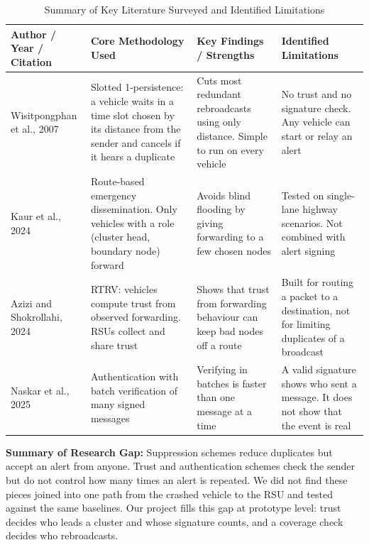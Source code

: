 \documentclass[11pt, a4paper]{article}
\begin{document}
\begin{table}[H]
    \centering
    \footnotesize
    \renewcommand{\arraystretch}{1.25}
    \begin{tabular}{|p{2.8cm}|p{4.2cm}|p{4.2cm}|p{3.2cm}|}
        \hline
        \textbf{Author / Year / Citation} & \textbf{Core Methodology Used} & \textbf{Key Findings / Strengths} & \textbf{Identified Limitations} \\
        \hline
        Wisitpongphan et al., 2007 \cite{wisitpongphan2007} & Slotted 1-persistence: a vehicle waits in a time slot chosen by its distance from the sender and cancels if it hears a duplicate & Cuts most redundant rebroadcasts using only distance. Simple to run on every vehicle & No trust and no signature check. Any vehicle can start or relay an alert \\
        \hline
        Kaur et al., 2024 \cite{kaur2024} & Route-based emergency dissemination. Only vehicles with a role (cluster head, boundary node) forward & Avoids blind flooding by giving forwarding to a few chosen nodes & Tested on single-lane highway scenarios. Not combined with alert signing \\
        \hline
        Azizi and Shokrollahi, 2024 \cite{azizi2024} & RTRV: vehicles compute trust from observed forwarding. RSUs collect and share trust & Shows that trust from forwarding behaviour can keep bad nodes off a route & Built for routing a packet to a destination, not for limiting duplicates of a broadcast \\
        \hline
        Naskar et al., 2025 \cite{naskar2025} & Authentication with batch verification of many signed messages & Verifying in batches is faster than one message at a time & A valid signature shows who sent a message. It does not show that the event is real \\
        \hline
    \end{tabular}
    \caption{Summary of Key Literature Surveyed and Identified Limitations}
    \label{tab:lit}
\end{table}

\noindent
\textbf{Summary of Research Gap:} Suppression schemes reduce duplicates but accept an alert from anyone. Trust and authentication schemes check the sender but do not control how many times an alert is repeated. We did not find these pieces joined into one path from the crashed vehicle to the RSU and tested against the same baselines. Our project fills this gap at prototype level: trust decides who leads a cluster and whose signature counts, and a coverage check decides who rebroadcasts.
\end{document}
